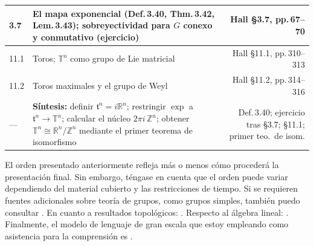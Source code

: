 \begin{assignment}[
  header=HeaderA,
  body=BodyA,
  title={Guia de Seminario Algebra Moderna},
  duedate={\today},
  toc=false,
  toctitle={},
  exlist=false
]
\begin{table}[H]
\begin{tabular}{@{} p{0.55cm} p{7.2cm} R @{}}
3.7 & El mapa exponencial (Def.\,3.40, Thm.\,3.42, Lem.\,3.43);
      sobreyectividad para $G$ conexo y conmutativo (ejercicio)
      & Hall \S3.7, pp.\,67--70 \\[6pt]
 
\midrule

11.1 & Toros; $\mathbb{T}^{n}$ como grupo de Lie matricial
       & Hall \S11.1, pp.\,310--313 \\[4pt]
 
11.2 & Toros maximales y el grupo de Weyl
       & Hall \S11.2, pp.\,314--316 \\[6pt]
 
\midrule
 
--- & \textbf{Síntesis:}
      definir $\mathfrak{t}^{n}=i\mathbb{R}^{n}$;
      restringir $\exp$ a $\mathfrak{t}^{n}\to\mathbb{T}^{n}$;
      calcular el núcleo $2\pi i\,\mathbb{Z}^{n}$;
      obtener $\mathbb{T}^{n}\cong\mathbb{R}^{n}/\mathbb{Z}^{n}$
      mediante el primer teorema de isomorfismo
      & Def.\,3.40; ejercicio tras \S3.7;
        \S11.1; primer teo.\ de isom. \\[4pt]
 
\bottomrule
\end{tabular}
\end{table}

El orden presentado anteriormente refleja más o menos cómo procederá la presentación final. Sin embargo, téngase en cuenta que el orden puede variar dependiendo del material cubierto y las restricciones de tiempo. Si se requieren fuentes adicionales sobre teoría de grupos, como grupos simples, también puedo consultar \textcite{silverman2022abstract}. En cuanto a resultados topológicos: \textcite{lopez2014point}. Respecto al álgebra lineal: \textcite{axler2024linear}. Finalmente, el modelo de lenguaje de gran escala que estoy empleando como asistencia para la comprensión es \textcite{claude2025}.


\end{assignment}